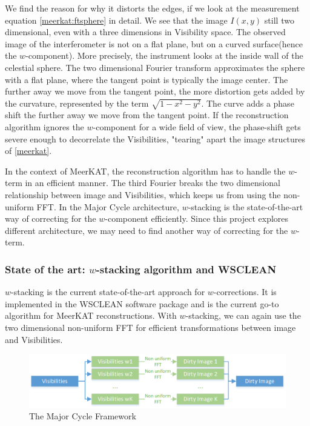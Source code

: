 We find the reason for why it distorts the edges, if we look at the measurement equation \eqref{meerkat:ftsphere} in detail. We see that the image $I(x,y)$ still two dimensional, even with a three dimensions in Visibility space. The observed image of the interferometer is not on a flat plane, but on a curved surface(hence the $w$-component)\cite{mcewen2011compressed}. More precisely, the instrument looks at the inside wall of the celestial sphere. The two dimensional Fourier transform approximates the sphere with a flat plane, where the tangent point is typically the image center. The further away we move from the tangent point, the more distortion gets added by the curvature, represented by the term $\sqrt{1 - x^2 - y ^2}$. The curve adds a phase shift the further away we move from the tangent point. If the reconstruction algorithm ignores the $w$-component for a wide field of view, the phase-shift gets severe enough to decorrelate the Visibilities, "tearing" apart the image structures of \eqref{meerkat}.

In the context of MeerKAT, the reconstruction algorithm has to handle the $w$-term in an efficient manner. The third Fourier breaks the two dimensional relationship between image and Visibilities, which keeps us from using the non-uniform FFT. In the Major Cycle architecture, $w$-stacking is the state-of-the-art way of correcting for the $w$-component efficiently. Since this project explores different architecture, we may need to find another way of correcting for the $w$-term.


\subsubsection{State of the art: $w$-stacking algorithm and WSCLEAN}
$w$-stacking\cite{pratley2018fast} is the current state-of-the-art approach for $w$-corrections. It is implemented in the WSCLEAN software package and is the current go-to algorithm for MeerKAT reconstructions. With $w$-stacking, we can again use the two dimensional non-uniform FFT for efficient transformations between image and Visibilities.

\begin{figure}
	\centering
	\vspace{-10pt}
	\includegraphics[width=1.0\linewidth]{./chapters/03.challenges/w-stacks.png}
	\caption{The Major Cycle Framework}
	\label{meerkat:w-stacks}
	\vspace{-10pt}
\end{figure}

